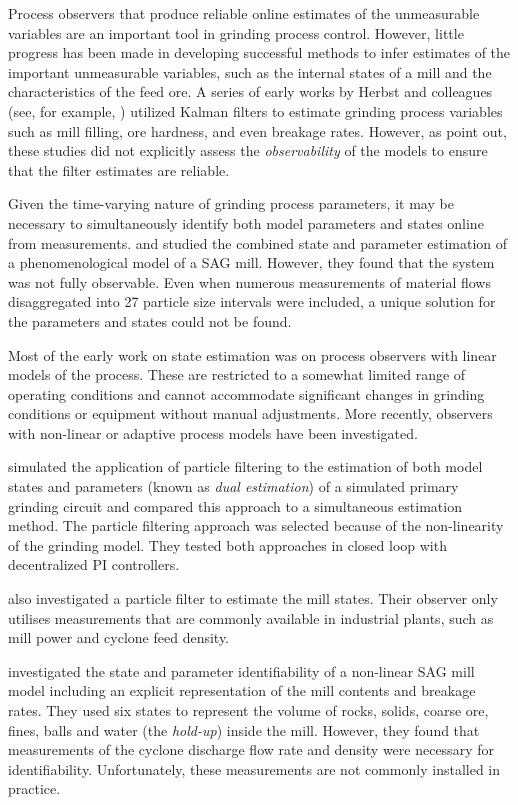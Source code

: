 Process observers that produce reliable online estimates of the unmeasurable variables are an important tool in grinding process control. However, little progress has been made in developing successful methods to infer estimates of the important unmeasurable variables, such as the internal states of a mill and the characteristics of the feed ore. A series of early works by Herbst and colleagues (see, for example, \cite{herbst_model-based_1992}) utilized Kalman filters to estimate grinding process variables such as mill filling, ore hardness, and even breakage rates. However, as \cite{le_roux_ekf_2017} point out, these studies did not explicitly assess the \textit{observability} of the models to ensure that the filter estimates are reliable.

Given the time-varying nature of grinding process parameters, it may be necessary to simultaneously identify both model parameters and states online from measurements. \cite{apelt_inferential_2002} and \cite{apelt_inferential_2002-1} studied the combined state and parameter estimation of a phenomenological model of a \gls{SAG} mill. However, they found that the system was not fully observable. Even when numerous measurements of material flows disaggregated into 27 particle size intervals were included, a unique solution for the parameters and states could not be found.

Most of the early work on state estimation was on process observers with linear models of the process. These are restricted to a somewhat limited range of operating conditions and cannot accommodate significant changes in grinding conditions or equipment without manual adjustments. More recently, observers with non-linear or adaptive process models have been investigated.

\cite{olivier_dual_2012} simulated the application of particle filtering to the estimation of both model states and parameters (known as \textit{dual estimation}) of a simulated primary grinding circuit and compared this approach to a simultaneous estimation method. The particle filtering approach was selected because of the non-linearity of the grinding model. They tested both approaches in closed loop with decentralized PI controllers.

\cite{le_roux_throughput_2016} also investigated a particle filter to estimate the mill states. Their observer only utilises measurements that are commonly available in industrial plants, such as mill power and cyclone feed density.

\cite{le_roux_state_2016} investigated the state and parameter identifiability of a non-linear \gls{SAG} mill model including an explicit representation of the mill contents and breakage rates. They used six states to represent the volume of rocks, solids, coarse ore, fines, balls and water (the \textit{hold-up}) inside the mill. However, they found that measurements of the cyclone discharge flow rate and density were necessary for identifiability. Unfortunately, these measurements are not commonly installed in practice.

